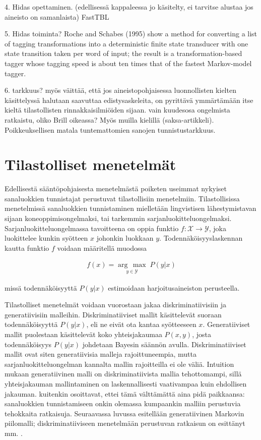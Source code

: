 \documentclass[utf8,bachelor,manualbib]{gradu3}
\newcommand{\argmax}[1]{\underset{#1}{\operatorname{arg}\,\operatorname{max}}\;}
\begin{document}
4. Hidas opettaminen. (edellisessä kappaleessa jo käsitelty, ei tarvitse alustaa jos aineisto on samanlaista) FastTBL

5. Hidas toiminta? Roche and Schabes (1995) show a method for converting a list
of tagging transformations into a deterministic finite state transducer with one state
transition taken per word of input; the result is a transformation-based tagger whose
tagging speed is about ten times that of the fastest Markov-model tagger.

6. tarkkuus? \citet{brill1995} myös väittää, että jos aineistopohjaisessa luonnollisten kielten käsittelyssä halutaan saavuttaa edistysaskeleita, on pyrittävä ymmärtämään itse kieltä tilastollisten rinnakkaisilmiöiden sijaan. \citet{manning2011} vain kuudesosa ongelmista ratkaistu, oliko Brill oikeassa? Myös muilla kielillä (saksa-artikkeli). Poikkeuksellisen matala tuntemattomien sanojen tunnistustarkkuus.


\chapter{Tilastolliset menetelmät}

Edellisestä sääntöpohjaisesta menetelmästä poiketen useimmat nykyiset sanaluokkien tunnistajat perustuvat tilastollisiin menetelmiin. Tilastollisissa menetelmissä sanaluokkien tunnistaminen mielletään lingvistisen lähestymistavan sijaan koneoppimisongelmaksi, tai tarkemmin sarjanluokitteluongelmaksi. Sarjanluokitteluongelmassa tavoitteena on oppia funktio $f: \mathcal{X} \to \mathcal{Y}$, joka luokittelee kunkin syötteen $x$ johonkin luokkaan $y$. Todennäköisyyslaskennan kautta funktio $f$ voidaan määritellä muodossa

\begin{align}
f(x) = \argmax{y \in \mathcal{Y}} P(y|x)
\end{align}

missä todennäköisyyttä $P(y|x)$ estimoidaan harjoitusaineiston perusteella.

Tilastolliset menetelmät voidaan vuorostaan jakaa diskriminatiivisiin ja generatiivisiin malleihin. Diskriminatiiviset mallit käsittelevät suoraan todennäköisyyttä $P(y|x)$, eli ne eivät ota kantaa syötteeseen $x$. Generatiiviset mallit puolestaan käsittelevät koko yhteisjakaumaa $P(x,y)$, josta todennäköisyys $P(y|x)$ johdetaan Bayesin säännön avulla. Diskriminatiiviset mallit ovat siten generatiivisia malleja rajoittuneempia, mutta sarjanluokitteluongelman kannalta mallin rajoitteilla ei ole väliä. Intuition mukaan generatiivinen malli on diskriminatiivista mallia tehottomampi, sillä yhteisjakauman mallintaminen on laskennallisesti vaativampaa kuin ehdollisen jakauman. \citet{ng2002} kuitenkin osoittavat, ettei tämä välttämättä aina pidä paikkaansa: sanaluokkien tunnistamiseen onkin olemassa kumpaankin malliin perustuvia tehokkaita ratkaisuja. Seuraavassa luvussa esitellään generatiivinen Markovin piilomalli; diskriminatiiviseen menetelmään perustuvan ratkaisun on esittänyt mm. \citet{ratnaparkhi1996}.
\end{document}
